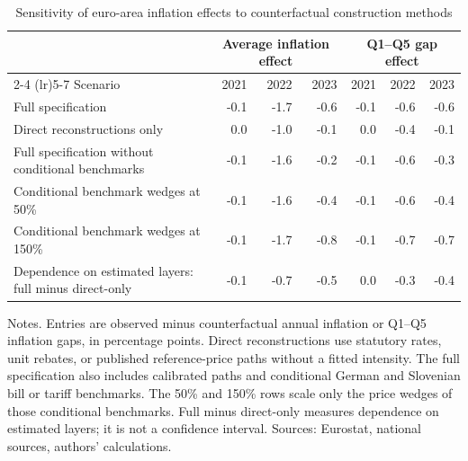 \begin{table}[H]
\small
\setlength{\tabcolsep}{4pt}

\caption{\label{tab:ea20-policy-method-sensitivity}Sensitivity of euro-area inflation effects to counterfactual construction methods}
\centering
\begin{tabular}[t]{lrrrrrr}
\toprule
\multicolumn{1}{c}{} & \multicolumn{3}{c}{Average inflation effect} & \multicolumn{3}{c}{Q1--Q5 gap effect}\\
\cmidrule(lr){2-4} \cmidrule(lr){5-7}
Scenario & 2021 & 2022 & 2023 & 2021 & 2022 & 2023\\
\midrule
Full specification & -0.1 & -1.7 & -0.6 & -0.1 & -0.6 & -0.6\\
Direct reconstructions only & 0.0 & -1.0 & -0.1 & 0.0 & -0.4 & -0.1\\
Full specification without conditional benchmarks & -0.1 & -1.6 & -0.2 & -0.1 & -0.6 & -0.3\\
Conditional benchmark wedges at 50\% & -0.1 & -1.6 & -0.4 & -0.1 & -0.6 & -0.4\\
Conditional benchmark wedges at 150\% & -0.1 & -1.7 & -0.8 & -0.1 & -0.7 & -0.7\\
\addlinespace
Dependence on estimated layers: full minus direct-only & -0.1 & -0.7 & -0.5 & 0.0 & -0.3 & -0.4\\
\bottomrule
\end{tabular}
\begin{flushleft}
\footnotesize{Notes. Entries are observed minus counterfactual annual inflation or Q1--Q5 inflation gaps, in percentage points. Direct reconstructions use statutory rates, unit rebates, or published reference-price paths without a fitted intensity. The full specification also includes calibrated paths and conditional German and Slovenian bill or tariff benchmarks. The 50\% and 150\% rows scale only the price wedges of those conditional benchmarks. Full minus direct-only measures dependence on estimated layers; it is not a confidence interval. Sources: Eurostat, national sources, authors' calculations.}
\end{flushleft}
\end{table}
